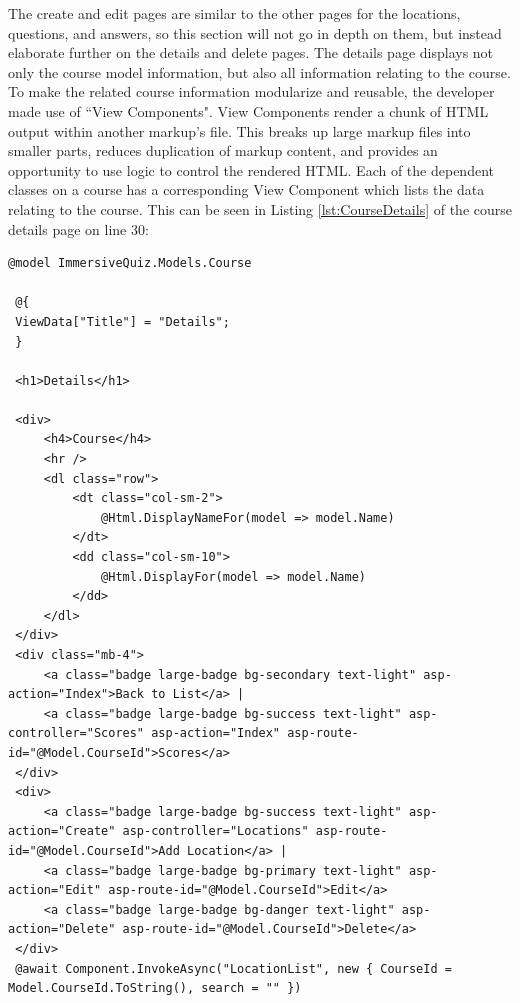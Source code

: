 The create and edit pages are similar to the other pages for the locations, questions, and answers, so this section will not go in depth on them, but instead elaborate further on the details and delete pages. The details page displays not only the course model information, but also all information relating to the course. To make the related course information modularize and reusable, the developer made use of ``View Components". View Components render a chunk of HTML output within another markup's file. This breaks up large markup files into smaller parts, reduces duplication of markup content, and provides an opportunity to use logic to control the rendered HTML. Each of the dependent classes on a course has a corresponding View Component which lists the data relating to the course. This can be seen in Listing \ref{lst:CourseDetails} of the course details page on line 30:
 \begin{lstlisting}[style=htmlcssjs, caption=Course Details Razor Page, label=lst:CourseDetails]
 @model ImmersiveQuiz.Models.Course
 
 @{
 ViewData["Title"] = "Details";
 }
 
 <h1>Details</h1>
 
 <div>
	 <h4>Course</h4>
	 <hr />
	 <dl class="row">
		 <dt class="col-sm-2">
			 @Html.DisplayNameFor(model => model.Name)
		 </dt>
		 <dd class="col-sm-10">
			 @Html.DisplayFor(model => model.Name)
		 </dd>
	 </dl>
 </div>
 <div class="mb-4">
	 <a class="badge large-badge bg-secondary text-light" asp-action="Index">Back to List</a> |
	 <a class="badge large-badge bg-success text-light" asp-controller="Scores" asp-action="Index" asp-route-id="@Model.CourseId">Scores</a>
 </div>
 <div>
	 <a class="badge large-badge bg-success text-light" asp-action="Create" asp-controller="Locations" asp-route-id="@Model.CourseId">Add Location</a> |
	 <a class="badge large-badge bg-primary text-light" asp-action="Edit" asp-route-id="@Model.CourseId">Edit</a>
	 <a class="badge large-badge bg-danger text-light" asp-action="Delete" asp-route-id="@Model.CourseId">Delete</a> 
 </div>
 @await Component.InvokeAsync("LocationList", new { CourseId = Model.CourseId.ToString(), search = "" })
 \end{lstlisting}
 
